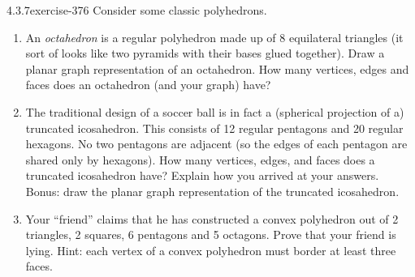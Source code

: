 \documentclass[twoside,11pt,]{book}
\numberwithin{equation}{chapter}
\begin{document}
\begin{divisionsolution}{4.3.7}{}{exercise-376}%
\hypertarget{p-4697}{}%
Consider some classic polyhedrons.\leavevmode%
\begin{enumerate}[label=(\alph*)]
\item\hypertarget{li-2296}{}\hypertarget{p-4698}{}%
An \emph{octahedron} is a regular polyhedron made up of 8 equilateral triangles (it sort of looks like two pyramids with their bases glued together). Draw a planar graph representation of an octahedron. How many vertices, edges and faces does an octahedron (and your graph) have? %
\item\hypertarget{li-2297}{}\hypertarget{p-4699}{}%
The traditional design of a soccer ball is in fact a (spherical projection of a) truncated icosahedron. This consists of 12 regular pentagons and 20 regular hexagons. No two pentagons are adjacent (so the edges of each pentagon are shared only by hexagons). How many vertices, edges, and faces does a truncated icosahedron have? Explain how you arrived at your answers. Bonus: draw the planar graph representation of the truncated icosahedron. %
\item\hypertarget{li-2298}{}\hypertarget{p-4700}{}%
Your ``friend'' claims that he has constructed a convex polyhedron out of 2 triangles, 2 squares, 6 pentagons and 5 octagons. Prove that your friend is lying. Hint: each vertex of a convex polyhedron must border at least three faces. %
\end{enumerate}
%
\end{divisionsolution}%
\end{document}
